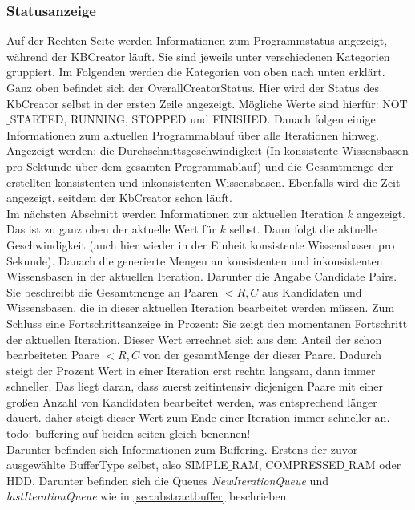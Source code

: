 \documentclass[12pt,a4paper]{article}
\begin{document}
\subsubsection{Statusanzeige}
Auf der Rechten Seite werden Informationen zum Programmstatus angezeigt, während der KBCreator läuft. Sie sind jeweils unter verschiedenen Kategorien gruppiert. Im Folgenden werden die Kategorien von oben nach unten erklärt. \\
Ganz oben befindet sich der OverallCreatorStatus. Hier wird der Status des KbCreator selbst in der ersten Zeile angezeigt. Mögliche Werte sind hierfür: NOT$\_$STARTED, RUNNING, STOPPED und FINISHED. Danach folgen einige Informationen zum aktuellen Programmablauf über alle Iterationen hinweg. Angezeigt werden: die Durchschnittsgeschwindigkeit (In konsistente Wissensbasen pro Sektunde über dem gesamten Programmablauf) und die Gesamtmenge der erstellten konsistenten und inkonsistenten Wissensbasen. Ebenfalls wird die Zeit angezeigt, seitdem der KbCreator schon läuft. \\
Im nächsten Abschnitt werden Informationen zur aktuellen Iteration $k$ angezeigt. Das ist zu ganz oben der aktuelle Wert für $k$ selbst. Dann folgt die aktuelle Geschwindigkeit (auch hier wieder in der Einheit konsistente Wissensbasen pro Sekunde). Danach die generierte Mengen an konsistenten und inkonsistenten Wissensbasen in der aktuellen Iteration. Darunter die Angabe \glqq Candidate Pairs\grqq \space. Sie beschreibt die Gesamtmenge an Paaren $<R, C$ aus Kandidaten und Wissensbasen, die in dieser aktuellen Iteration bearbeitet werden müssen. Zum Schluss eine Fortschrittsanzeige in Prozent: Sie zeigt den momentanen Fortschritt der aktuellen Iteration. Dieser Wert errechnet sich aus dem Anteil der schon bearbeiteten Paare $<R,C$ von der gesamtMenge der dieser Paare. Dadurch steigt der Prozent Wert in einer Iteration erst rechtn langsam, dann immer schneller. Das liegt daran, dass zuerst zeitintensiv diejenigen Paare mit einer großen Anzahl von Kandidaten bearbeitet werden, was entsprechend länger dauert. daher steigt dieser Wert zum Ende einer Iteration immer schneller an. \\
todo: buffering auf beiden seiten gleich benennen! \\
Darunter befinden sich Informationen zum Buffering. Erstens der zuvor ausgewählte BufferType selbst, also SIMPLE$\_$RAM, COMPRESSED$\_$RAM oder HDD. Darunter befinden sich die Queues \textit{NewIterationQueue} und \textit{lastIterationQueue} wie in \autoref{sec:abstractbuffer} beschrieben. \\
\end{document}

